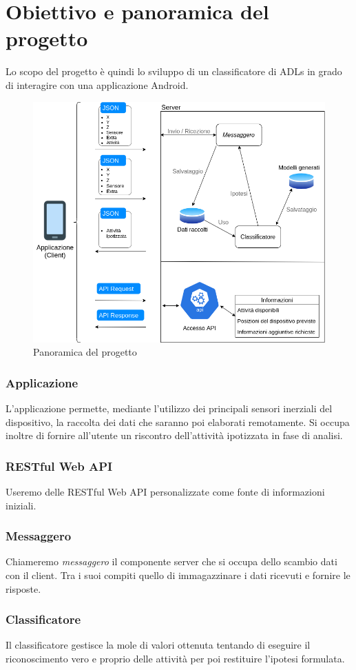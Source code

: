 \newpage
\section{Obiettivo e panoramica del progetto}
Lo scopo del progetto è quindi lo sviluppo di un classificatore di ADLs in grado di interagire con una applicazione
Android.

\begin{figure}[H]
    \centering
    \includegraphics[scale = 0.50]{assets/images/overview.png}
    \caption{Panoramica del progetto}
    \label{fig:overview}
\end{figure}

\subsubsection{Applicazione}
L'applicazione permette, mediante l'utilizzo dei principali sensori inerziali del dispositivo, la raccolta dei dati che saranno poi elaborati 
remotamente. Si occupa inoltre di fornire all'utente un riscontro dell'attività ipotizzata in fase di analisi.
\subsubsection{RESTful Web API}
Useremo delle RESTful Web API personalizzate come fonte di informazioni iniziali.
\subsubsection{Messaggero}
Chiameremo \textit{messaggero} il componente server che si occupa dello scambio dati con il client. Tra i suoi compiti 
quello di immagazzinare i dati ricevuti e fornire le risposte.
\subsubsection{Classificatore}
Il classificatore gestisce la mole di valori ottenuta 
tentando di eseguire il riconoscimento vero e proprio delle attività 
per poi restituire l'ipotesi formulata.